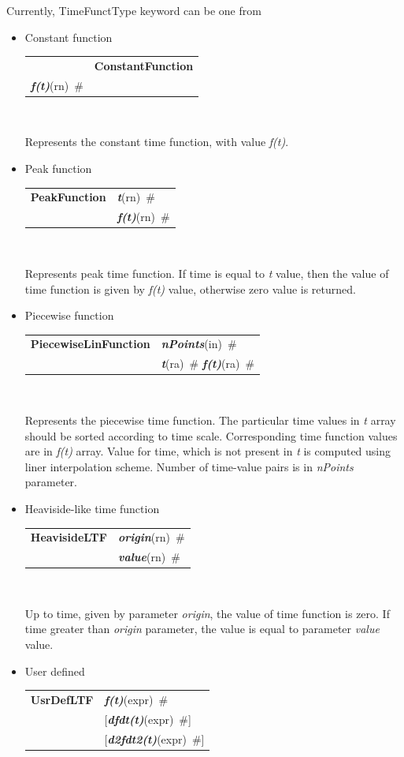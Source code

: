 \documentclass[a4paper]{article}
\makeatletter
\newcommand{\param}[1]{{\em #1}}
\newcommand{\keywordnotype}[1]{\mbox{{\it{\bf{#1}}}}}
\newcommand{\keyword}[2]{\mbox{{\keywordnotype{#1}\tiny (#2)}}}
\newcommand{\entKeywordInst}[1]{\mbox{{\bf{{#1}}}}}
\newcommand{\field}[2]{\mbox{\keyword{#1}{#2}~\#}}
\newcommand{\optField}[2]{\mbox{[\field{#1}{#2}]}}
\newenvironment{record}[1][]{\begin{tabular}{|ll}}{\end{tabular}\\}
\newcommand{\recentry}[2]{{#1}&{#2}\\}
\newcounter{rcc}
\newenvironment{record}[1][\textwidth]{\setcounter{rcc}{0}\begin{tabular*}{#1}{|ll@{\extracolsep{\fill}}r}}{\end{tabular*}\\}
\newcommand{\recentry}[2]{\ifthenelse{\value{rcc}>0}{&$\backslash$ \\}{\setcounter{rcc}{1}}{#1}&{#2}}
\makeatother
\begin{document}
Currently, TimeFunctType keyword can be one from
\begin{itemize}
\item Constant function

\noindent
\begin{record}[0.9\textwidth]
  \recentry{}{\entKeywordInst{ConstantFunction}}{\field{f(t)}{rn}}
\end{record}

Represents the constant time function, with value \param{f(t)}.

\item Peak function

  \begin{record}[0.9\textwidth]
    \recentry{\entKeywordInst{PeakFunction}}{\field{t}{rn}}
    \recentry{}{\field{f(t)}{rn}}
  \end{record}

Represents peak time function. If time is equal to \param{t}
value, then the value of time function is given by \param{f(t)} value,
otherwise zero value is returned.

\item Piecewise function

  \begin{record}[0.9\textwidth]
    \recentry{\entKeywordInst{PiecewiseLinFunction}}{\field{nPoints}{in}}
    \recentry{}{\field{t}{ra} \field{f(t)}{ra}}
  \end{record}

  Represents the piecewise time function. The particular time values in
\param{t} array  should be sorted according to time scale. Corresponding time
function values are in \param{f(t)} array. Value for time, which
is not present in \param{t} is computed using liner interpolation scheme.
Number of time-value pairs is in \param{nPoints} parameter.
\item Heaviside-like time function

  \begin{record}[0.9\textwidth]
    \recentry{\entKeywordInst{HeavisideLTF}}{\field{origin}{rn}}
    \recentry{}{\field{value}{rn}}
  \end{record}

Up to time, given by
parameter \param{origin}, the value of time function is zero. If time
greater than \param{origin} parameter, the value is
equal to parameter \param{value} value.
\item User defined

  \begin{record}[0.9\textwidth]
    \recentry{\entKeywordInst{UsrDefLTF}}{\field{f(t)}{expr}}
    \recentry{}{\optField{dfdt(t)}{expr}} \recentry{}{\optField{d2fdt2(t)}{expr}}
  \end{record}


\end{itemize}
\end{document}
